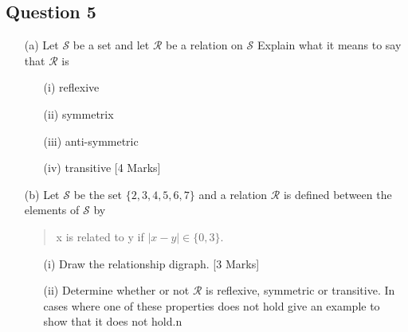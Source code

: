 \documentclass[a4paper,12pt]{article}
\begin{document}
\subsection*{Question 5}
\begin{itemize}
\item[(a)] Let $\mathcal{S}$ be a set and let $\mathcal{R}$ be a relation on $\mathcal{S}$
Explain what it means to say that $\mathcal{R}$ is

\begin{itemize}
\item[(i)] reflexive
\item[(ii)] symmetrix
\item[(iii)] anti-symmetric
\item[(iv)] transitive [4 Marks]
\end{itemize}

\item[(b)]  Let $\mathcal{S}$ be the set $\{2,3,4,5,6,7\}$ and a relation $\mathcal{R}$ is defined between the elements of $\mathcal{S}$ by
    \begin{center}
\begin{quote}
x is related to y if $|x - y| \in \{0,3\}$.
\end{quote}
\end{center}
\begin{itemize}
\item[(i)] Draw the relationship digraph. [3 Marks]
\item[(ii)] Determine whether or not $\mathcal{R}$ is reflexive, symmetric or transitive. In cases
where one of these properties does not hold give an example to show that
it does not hold.n \newline [3 Marks]
\end{itemize}
\end{itemize}
\newpage
\newpage
\end{document}
